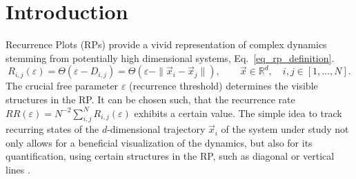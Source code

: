 \documentclass[entropy,article,submit,pdftex,moreauthors]{Definitions/mdpi}
\begin{document}
\section{Introduction}\label{sec_tau_rr_intro}

Recurrence Plots (RPs) provide a vivid representation of complex dynamics stemming from potentially high dimensional systems, Eq.~\eqref{eq_rp_definition}. 
\begin{equation}\label{eq_rp_definition}
R_{i,j}(\varepsilon) = \Theta\left(\varepsilon - D_{i,j}\right) 
= \Theta\left(\varepsilon - \| \vec{x}_i - \vec{x}_j\|\right), \qquad \vec{x} \in \mathbb{R}^d, \quad i,j \in [1,\ldots, N].
\end{equation}
The crucial free parameter $\varepsilon$ (recurrence threshold) determines the visible structures in the RP. It can be chosen such, that the recurrence rate 
$RR(\varepsilon)=N^{-2}\sum_{i,j}^N R_{i,j}(\varepsilon)$ exhibits a certain value.
The simple idea to track recurring states of the $d$-dimensional trajectory $\vec{x}_i$ of the system under study not only allows for a beneficial visualization of the dynamics, but also for its 
quantification, using certain structures in the RP, such as diagonal or vertical lines \cite{marwan2007}. 
\end{document}
